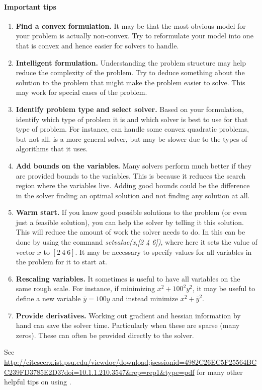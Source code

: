\paragraph{Important tips}
\begin{enumerate}
\item \textbf{Find a convex formulation.}  It may be that the most obvious model for your problem is actually non-convex.  Try to reformulate your model into one that is convex and hence easier for solvers to handle.
\item \textbf{Intelligent formulation.}  Understanding the problem structure may help reduce the complexity of the problem.  Try to deduce something about the solution to the problem that might make the problem easier to solve.  This may work for special cases of the problem.
\item \textbf{Identify problem type and select solver.}  Based on your formulation, identify which type of problem it is and which solver is best to use for that type of problem.  For instance, \gurobi can handle some convex quadratic problems, but not all.  \ipopt is a more general solver, but may be slower due to the types of algorithms that it uses.

\item \textbf{Add bounds on the variables.} Many solvers perform much better if they are provided bounds to the variables.  This is because it reduces the search region where the variables live.   Adding good bounds could be the difference in the solver finding an optimal solution and not finding any solution at all.
\item \textbf{Warm start.} If you know good possible solutions to the problem (or even just a feasible solution), you can help the solver by telling it this solution.  This will reduce the amount of work the solver needs to do.  In \jump this can be done by using the command \textit{setvalue(x,[2 4 6])}, where here it sets the value of vector $x$ to $[2\ 4\ 6]$.  It may be necessary to specify values for all variables in the problem for it to start at.
\item \textbf{Rescaling variables.} It sometimes is useful to have all variables on the same rough scale.  For instance, if minimizing $x^2 + 100^2 y^2$, it may be useful to define a new variable $\bar y = 100y$ and instead minimize $x^2 + \bar y^2$.
\item \textbf{Provide derivatives.} Working out gradient and hessian information by hand can save the solver time.  Particularly when these are sparse (many zeros).  These can often be provided directly to the solver.
\end{enumerate}
See \url{http://citeseerx.ist.psu.edu/viewdoc/download;jsessionid=4982C26EC5F25564BCC239FD3785E2D3?doi=10.1.1.210.3547&rep=rep1&type=pdf} for many other helpful tips on using \ipopt.
